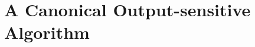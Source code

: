 \section{A Canonical Output-sensitive Algorithm}
\begin{frame}\frametitle{\insertsection}\justifying

\end{frame}